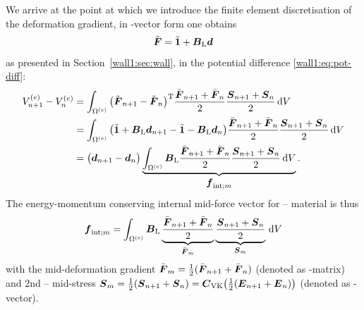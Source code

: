 
We arrive at the point at which we introduce the finite element discretisation
of the deformation gradient, \ie{} in -vector form one obtains
\begin{equation}
   \tilde{\boldsymbol{F}}
   = \tilde{\boldsymbol{1}} + \boldsymbol{B}_{\text{L}} \boldsymbol{d}
\end{equation}
as presented in Section~\ref{wall1:sec:wall}, in the potential difference
\eqref{wall1:eq:pot-diff}:
\begin{equation}
\begin{aligned}
   V_{n+1}^{(e)} - V_n^{(e)}
&  = \int_{\Omega^{(e)}} \big( \tilde{\boldsymbol{F}}_{n+1} - \tilde{\boldsymbol{F}}_{n} \big)^{\mathrm{T}}
     \frac{\bar{\boldsymbol{F}}_{n+1} + \bar{\boldsymbol{F}}_{n}}{2}
     \frac{\boldsymbol{S}_{n+1} + \boldsymbol{S}_n}{2} 
     \, \mathrm{d} V
\\
&  = \int_{\Omega^{(e)}}
     \big( \tilde{\boldsymbol{1}} + \boldsymbol{B}_{\text{L}} \boldsymbol{d}_{n+1} 
           - \tilde{\boldsymbol{1}} - \boldsymbol{B}_{\text{L}} \boldsymbol{d}_n \big)
     \frac{\bar{\boldsymbol{F}}_{n+1} + \bar{\boldsymbol{F}}_{n}}{2}
     \frac{\boldsymbol{S}_{n+1} + \boldsymbol{S}_n}{2} 
     \, \mathrm{d} V
\\
&  = \big( \boldsymbol{d}_{n+1} - \boldsymbol{d}_n \big)
     \underbrace{\int_{\Omega^{(e)}}
     \boldsymbol{B}_{\text{L}} \frac{\bar{\boldsymbol{F}}_{n+1} + \bar{\boldsymbol{F}}_{n}}{2}
     \frac{\boldsymbol{S}_{n+1} + \boldsymbol{S}_n}{2} 
     \, \mathrm{d} V}_{\displaystyle\boldsymbol{f}_{\text{int};m}}
     \text{.}
\end{aligned}
\end{equation}
The energy-momentum conserving internal mid-force vector for -- material is thus
\begin{equation}\label{wall1:eq:mid-internal-pure-disp-vkmat}
   \boldsymbol{f}_{\text{int};m}
   = \int_{\Omega^{(e)}}
     \boldsymbol{B}_{\text{L}} \underbrace{\frac{\bar{\boldsymbol{F}}_{n+1} + \bar{\boldsymbol{F}}_{n}}{2}}_{\bar{\boldsymbol{F}}_m}
     \underbrace{\frac{\boldsymbol{S}_{n+1} + \boldsymbol{S}_n}{2}}_{\boldsymbol{S}_m}
     \, \mathrm{d} V
\end{equation}
with the mid-deformation gradient $\bar{\boldsymbol{F}}_m=\frac{1}{2}(\bar{\boldsymbol{F}}_{n+1} +
\bar{\boldsymbol{F}}_{n})$ (denoted as -matrix) and 2nd
-- mid-stress $\boldsymbol{S}_m =
\frac{1}{2}(\boldsymbol{S}_{n+1} + \boldsymbol{S}_n)=\boldsymbol{C}_{\text{VK}}\big(\frac{1}{2}(\boldsymbol{E}_{n+1} + \boldsymbol{E}_n)\big)$ (denoted as -vector).

